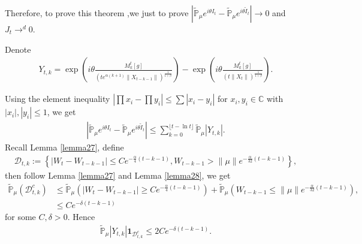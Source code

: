 \documentclass[12pt, a4paper]{amsart}
\theoremstyle{definition}
\numberwithin{equation}{section}
\begin{document}
    Therefore, to prove this theorem ,we just to prove $\left|\mathbb{\tilde{P}}_{\mu}e^{i\theta I_t}-\mathbb{\tilde{P}}_{\mu}e^{i\theta\tilde{I}_t}\right|\rightarrow 0$ and $J_t\rightarrow^d 0$.
    
    Denote
    \begin{align*}
        Y_{t,k}=\exp\left(i\theta\frac{M_k^t[g]}{(t e^{\alpha(k+1)}\|X_{t-k-1}\|)^{\frac{1}{1+\beta}}}\right)-\exp\left(i\theta\frac{M_k^t[g]}{\left(t\|X_t\|\right)^{\frac{1}{1+\beta}}}\right).
    \end{align*}
    
    Using the element inequality $|\prod x_i-\prod y_i|\leq\sum |x_i-y_i|$ for $x_i,y_i \in \mathbb{C}$ with $|x_i|,|y_i|\leq 1$, we get
    \begin{align*}
        \left|\mathbb{\tilde{P}}_{\mu}e^{i\theta I_t}-\mathbb{\tilde{P}}_{\mu}e^{i\theta\tilde{I}_t}\right|\leq \sum_{k=0}^{\lfloor t-\ln t \rfloor}\mathbb{\tilde{P}}_{\mu}|Y_{t,k}|.
    \end{align*}
    Recall Lemma \ref{lemma27}, define
    \begin{align*}
        \mathcal{D}_{t,k}:=\left\{|W_t-W_{t-k-1}|\leq C e^{-\frac{\alpha}{4}(t-k-1)}, W_{t-k-1}>\|\mu\|e^{-\frac{\alpha}{32}(t-k-1)}\right\},
    \end{align*}
    then follow Lemma \ref{lemma27} and Lemma \ref{lemma28}, we get
    \begin{align*}
        \mathbb{\tilde{P}}_{\mu}(\mathcal{D}_{t,k}^c)&\leq \mathbb{\tilde{P}}_{\mu}(|W_t-W_{t-k-1}|\geq C e^{-\frac{\alpha}{4}(t-k-1)})+\mathbb{\tilde{P}}_{\mu}(W_{t-k-1}\leq \|\mu\|e^{-\frac{\alpha}{32}(t-k-1)}),\\
        &\leq C e^{-\delta(t-k-1)}
    \end{align*}
    for some $C,\delta>0$. Hence
    \begin{align}
        \mathbb{\tilde{P}}_{\mu}|Y_{t,k}|\mathbf{1}_{\mathcal{D}^c_{t,k}}\leq 2 C e^{-\delta(t-k-1)}.\label{thm121}
    \end{align}
    
\end{document}
